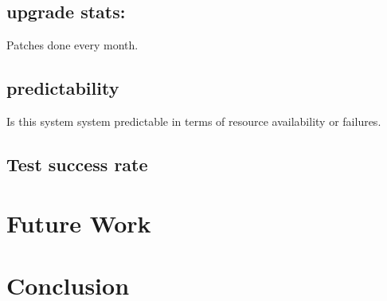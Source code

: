 \documentclass{sig-alternate}
\begin{document}
\subsection{upgrade stats:} Patches done every month. 
\subsection{predictability} Is this system system predictable in terms of resource availability or failures.
\subsection{Test success rate}


\section{Future Work}

\section{Conclusion}





 
\end{document}
